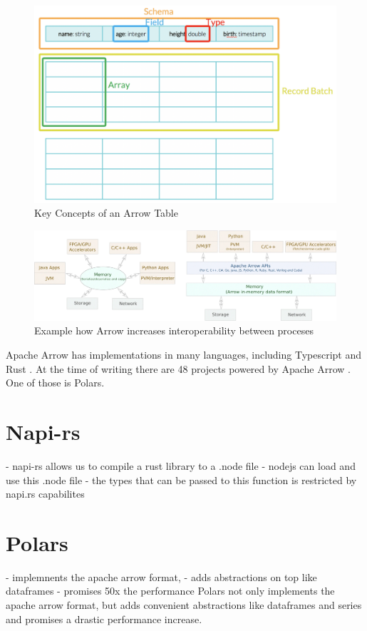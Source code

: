 \begin{figure}
	\includegraphics[width=\textwidth]{resources/arrow_tab}
	\caption{Key Concepts of an Arrow Table \autocite{Dremio}}
	\label{fig:arrow_tab}
\end{figure}
\begin{figure}
	\includegraphics[width=\textwidth]{resources/arrow_interop}
	\caption{Example how Arrow increases interoperability between proceses \autocite{Ahmad2020}}
	\label{fig:arrow_com}
\end{figure}

Apache Arrow has implementations in many languages, including Typescript and Rust \autocite{arrow:status}.
At the time of writing there are 48 projects powered by Apache Arrow \autocite{arrow:projects}.
One of those is Polars.


\section{Napi-rs}
- napi-rs allows us to compile a rust library to a .node file
- nodejs can load and use this .node file
- the types that can be passed to this function is restricted by napi.rs capabilites


\section{Polars}
\label{section:polars}

- implemnents the apache arrow format,
- adds abstractions on top like dataframes
- promises 50x the performance
Polars not only implements the apache arrow format, but adds convenient abstractions like dataframes and series and promises a drastic performance increase.

